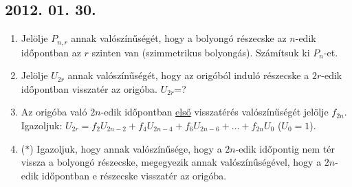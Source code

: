 \documentclass{article}
\begin{document}

\subsection*{2012. 01. 30.}
\begin{enumerate}
\item
Jelölje $P_{n,r}$ annak valószínűségét, hogy a bolyongó részecske az $n$-edik időpontban az $r$ szinten van (szimmetrikus bolyongás). Számítsuk ki $P_{n}$-et.
\item
Jelölje $U_{2r}$ annak valószínűségét, hogy az origóból induló részecske a $2r$-edik időpontban visszatér az origóba. $U_{2r}$=?
\item
Az origóba való $2n$-edik időpontban \underline{első} visszatérés valószínűségét jelölje $f_{2n}$. Igazoljuk: $U_{2r}=f_{2}U_{2n-2}+f_{4}U_{2n-4}+f_{6}U_{2n-6}+\ldots+f_{2n}U_{0}$ ($U_{0}=1$).
\item ($*$)
Igazoljuk, hogy annak valószínűsége, hogy a $2n$-edik  időpontig nem tér vissza a bolyongó részecske, megegyezik annak valószínűségével, hogy a $2n$-edik időpontban e részecske visszatér az origóba.
\end{enumerate}
\end{document}
